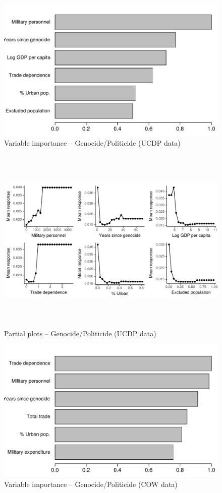 \begin{figure}[H]
    \centering
    \includegraphics{images/drf-gp1.pdf}
    \caption{Variable importance -- Genocide/Politicide (UCDP data)}
    \label{fig:my_label}
\end{figure}

\begin{figure}[H]
    \centering
    \includegraphics[width=\textwidth, height=9cm]{images/drfdpp5a.pdf}
    \caption{Partial plots -- Genocide/Politicide (UCDP data)}
    \label{fig:my_label}
\end{figure}

\begin{figure}[H]
    \centering
    \includegraphics{images/drf-gp2.pdf}
    \caption{Variable importance -- Genocide/Politicide (COW data)}
    \label{fig:my_label}
\end{figure}

